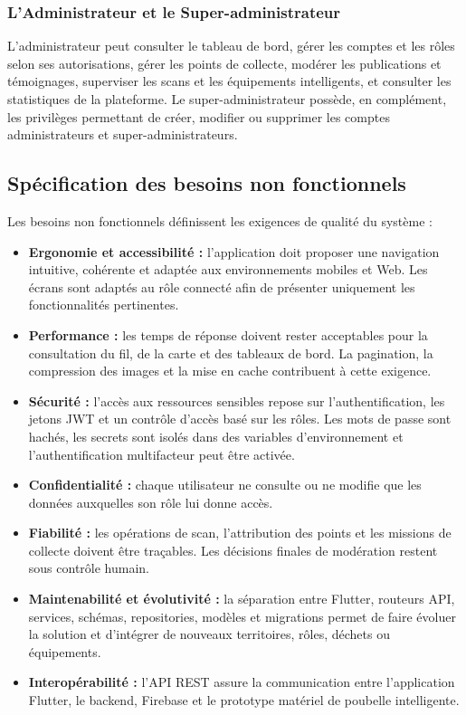 \subsubsection{L'Administrateur et le Super-administrateur}

L'administrateur peut consulter le tableau de bord, gérer les comptes et les rôles selon ses autorisations, gérer les points de collecte, modérer les publications et témoignages, superviser les scans et les équipements intelligents, et consulter les statistiques de la plateforme. Le super-administrateur possède, en complément, les privilèges permettant de créer, modifier ou supprimer les comptes administrateurs et super-administrateurs.

\subsection{Spécification des besoins non fonctionnels}
\label{subsec:besoins_non_fonctionnels}

Les besoins non fonctionnels définissent les exigences de qualité du système :
\begin{itemize}
    \item \textbf{Ergonomie et accessibilité :} l'application doit proposer une navigation intuitive, cohérente et adaptée aux environnements mobiles et Web. Les écrans sont adaptés au rôle connecté afin de présenter uniquement les fonctionnalités pertinentes.
    \item \textbf{Performance :} les temps de réponse doivent rester acceptables pour la consultation du fil, de la carte et des tableaux de bord. La pagination, la compression des images et la mise en cache contribuent à cette exigence.
    \item \textbf{Sécurité :} l'accès aux ressources sensibles repose sur l'authentification, les jetons JWT et un contrôle d'accès basé sur les rôles. Les mots de passe sont hachés, les secrets sont isolés dans des variables d'environnement et l'authentification multifacteur peut être activée.
    \item \textbf{Confidentialité :} chaque utilisateur ne consulte ou ne modifie que les données auxquelles son rôle lui donne accès.
    \item \textbf{Fiabilité :} les opérations de scan, l'attribution des points et les missions de collecte doivent être traçables. Les décisions finales de modération restent sous contrôle humain.
    \item \textbf{Maintenabilité et évolutivité :} la séparation entre Flutter, routeurs API, services, schémas, repositories, modèles et migrations permet de faire évoluer la solution et d'intégrer de nouveaux territoires, rôles, déchets ou équipements.
    \item \textbf{Interopérabilité :} l'API REST assure la communication entre l'application Flutter, le backend, Firebase et le prototype matériel de poubelle intelligente.
\end{itemize}

